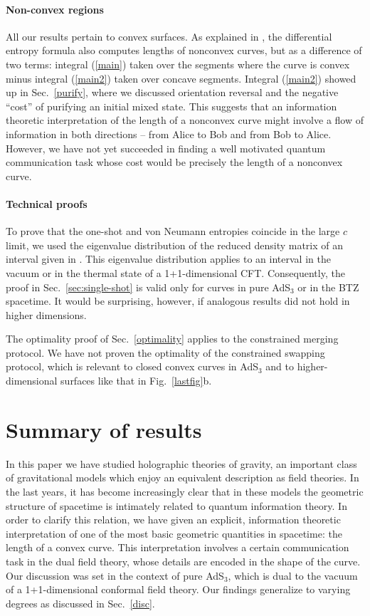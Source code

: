 \documentclass[12pt]{article}
\newcommand{\secref}[1]{Sec.~\ref{#1}}
\begin{document}
\paragraph{Non-convex regions}
All our results pertain to convex surfaces.  As explained in \cite{lampros}, the differential entropy formula also computes lengths of nonconvex curves, but as a difference of two terms: integral (\ref{main}) taken over the segments where the curve is convex minus integral (\ref{main2}) taken over concave segments. Integral (\ref{main2}) showed up in Sec.~\ref{purify}, where we discussed orientation reversal and the negative ``cost'' of purifying an initial mixed state. This suggests that an information theoretic interpretation of the length of a nonconvex curve might involve a flow of information in both directions -- from Alice to Bob and from Bob to Alice. However, we have not yet succeeded in finding a well motivated quantum communication task whose cost would be precisely the length of a nonconvex curve.

\paragraph{Technical proofs}
To prove that the one-shot and von Neumann entropies coincide in the large $c$ limit, we used the eigenvalue distribution of the reduced density matrix of an interval given in \cite{calabrese-eigs}. This eigenvalue distribution applies to an interval in the vacuum or in the thermal state of a 1+1-dimensional CFT. Consequently, the proof in Sec.~\ref{sec:single-shot} is valid only for curves in pure AdS$_3$ or in the BTZ spacetime. It would be surprising, however, if analogous results did not hold in higher dimensions.

The optimality proof of Sec.~\ref{optimality} applies to the constrained merging protocol. We have not proven the optimality of the constrained swapping protocol, which is relevant to closed convex curves in AdS$_3$ and to higher-dimensional surfaces like that in Fig.~\ref{lastfig}b.

\section{Summary of results}

In this paper we have studied holographic theories of gravity, an important class of gravitational models which enjoy an equivalent description as field theories. In the last years, it has become increasingly clear that in these models the geometric structure of spacetime is intimately related to quantum information theory. In order to clarify this relation, we have given an explicit, information theoretic interpretation of one of the most basic geometric quantities in spacetime: the length of a convex curve. This interpretation involves a certain communication task in the dual field theory, whose details are encoded in the shape of the curve. Our discussion was set in the context of pure AdS$_3$, which is dual to the vacuum of a 1+1-dimensional conformal field theory. Our findings generalize to varying degrees as discussed in \secref{disc}.
\end{document}

